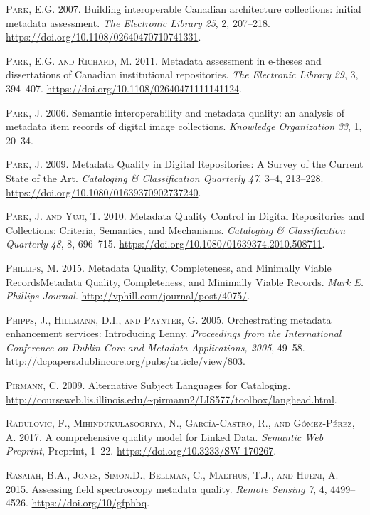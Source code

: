 \textsc{Park, E.G.} 2007. Building interoperable Canadian architecture collections: initial metadata assessment. \emph{The Electronic Library} \emph{25}, 2, 207–218. \url{https://doi.org/10.1108/02640470710741331}.

\textsc{Park, E.G. and Richard, M.} 2011. Metadata assessment in e-theses and dissertations of Canadian institutional repositories. \emph{The Electronic Library} \emph{29}, 3, 394–407. \url{https://doi.org/10.1108/02640471111141124}.

\textsc{Park, J.} 2006. Semantic interoperability and metadata quality: an analysis of metadata item records of digital image collections. \emph{Knowledge Organization} \emph{33}, 1, 20–34.

\textsc{Park, J.} 2009. Metadata Quality in Digital Repositories: A Survey of the Current State of the Art. \emph{Cataloging \& Classification Quarterly} \emph{47}, 3–4, 213–228. \url{https://doi.org/10.1080/01639370902737240}.

\textsc{Park, J. and Yuji, T.} 2010. Metadata Quality Control in Digital Repositories and Collections: Criteria, Semantics, and Mechanisms. \emph{Cataloging \& Classification Quarterly} \emph{48}, 8, 696–715. \url{https://doi.org/10.1080/01639374.2010.508711}.

\textsc{Phillips, M.} 2015. Metadata Quality, Completeness, and Minimally Viable RecordsMetadata Quality, Completeness, and Minimally Viable Records. \emph{Mark E. Phillips Journal}. \url{http://vphill.com/journal/post/4075/}.

\textsc{Phipps, J., Hillmann, D.I., and Paynter, G.} 2005. Orchestrating metadata enhancement services: Introducing Lenny. \emph{Proceedings from the International Conference on Dublin Core and Metadata Applications, 2005}, 49–58. \url{http://dcpapers.dublincore.org/pubs/article/view/803}.

\textsc{Pirmann, C.} 2009. Alternative Subject Languages for Cataloging. \url{http://courseweb.lis.illinois.edu/~pirmann2/LIS577/toolbox/langhead.html}.

\textsc{Radulovic, F., Mihindukulasooriya, N., García-Castro, R., and Gómez-Pérez, A.} 2017. A comprehensive quality model for Linked Data. \emph{Semantic Web} \emph{Preprint}, Preprint, 1–22. \url{https://doi.org/10.3233/SW-170267}.

\textsc{Rasaiah, B.A., Jones, Simon.D., Bellman, C., Malthus, T.J., and Hueni, A.} 2015. Assessing field spectroscopy metadata quality. \emph{Remote Sensing} \emph{7}, 4, 4499–4526. \url{https://doi.org/10/gfphbq}.

